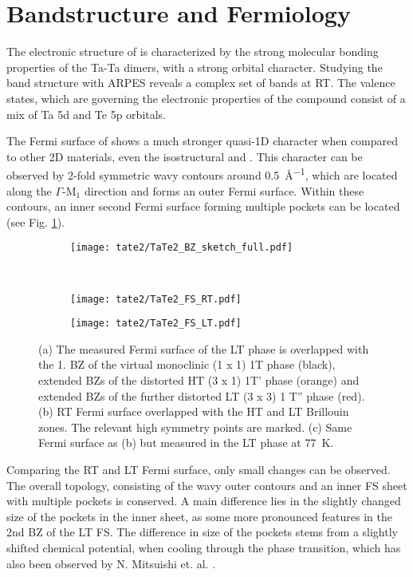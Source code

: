 \section{Bandstructure and Fermiology}

The electronic structure of  is characterized by the strong molecular bonding properties of the Ta-Ta dimers, with a strong orbital character.
Studying the band structure with ARPES reveals a complex set of bands at RT.
The valence states, which are governing the electronic properties of the compound consist of a mix of Ta 5d and Te 5p orbitals. \cite{mitsuishi_unveiling_2024}

The Fermi surface of  shows a much stronger quasi-1D character when compared to other 2D materials, even the isostructural  and .
This character can be observed by 2-fold symmetric wavy contours around \SI{0.5}{\angstrom^{-1}}, which are located along the $\Gamma$-M$_1$ direction and forms an outer Fermi surface.
Within these contours, an inner second Fermi surface forming multiple pockets can be located (see Fig. \ref{fig:TaTe_FS}).

\begin{figure}[h!]
	\centering
	\begin{subfigure}[b]{0.5\textwidth}
		\texttt{[image: tate2/TaTe2\_BZ\_sketch\_full.pdf]}
		\caption{}
	\end{subfigure}
	\hfill
	\\
	\begin{subfigure}[b]{0.49\textwidth}
		\texttt{[image: tate2/TaTe2\_FS\_RT.pdf]}
		\caption{}
	\end{subfigure}
	\hfill
	\begin{subfigure}[b]{0.49\textwidth}
		\texttt{[image: tate2/TaTe2\_FS\_LT.pdf]}
		\caption{}
	\end{subfigure}
	\caption{(a) The measured Fermi surface of the LT phase is overlapped with the 1. BZ of the virtual monoclinic (1 x 1) 1T phase (black), extended BZs of the distorted HT (3 x 1) 1T' phase (orange) and extended BZs of the further distorted LT (3 x 3) 1 T'' phase (red). (b) RT Fermi surface overlapped with the HT and LT Brillouin zones. The relevant high symmetry points are marked. (c) Same Fermi surface as (b) but measured in the LT phase at \SI{77}{\kelvin}.}
	\label{fig:TaTe_FS}
\end{figure}

Comparing the RT and LT Fermi surface, only small changes can be observed.
The overall topology, consisting of the wavy outer contours and an inner FS sheet with multiple pockets is conserved.
A main difference lies in the slightly changed size of the pockets in the inner sheet, as some more pronounced features in the 2nd BZ of the LT FS.
The difference in size of the pockets stems from a slightly shifted chemical potential, when cooling through the phase transition, which has also been observed by N. Mitsuishi et. al. \cite{mitsuishi_unveiling_2024}.

